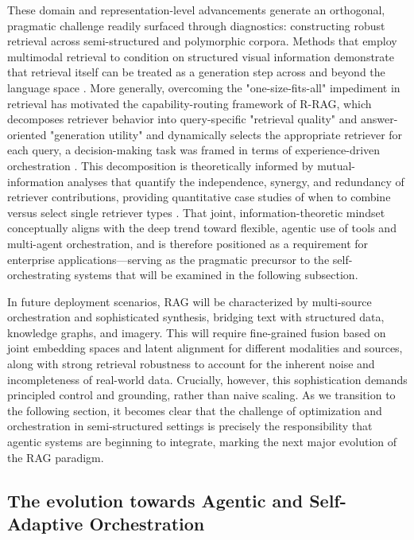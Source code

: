 \documentclass[11pt,a4paper]{article}
\begin{document}
These domain and representation-level advancements generate an orthogonal, pragmatic challenge readily surfaced through diagnostics: constructing robust retrieval across semi-structured and polymorphic corpora. Methods that employ multimodal retrieval to condition on structured visual information demonstrate that retrieval itself can be treated as a generation step across and beyond the language space \cite{arxiv:2407.01219v1}. More generally, overcoming the "one-size-fits-all" impediment in retrieval has motivated the capability-routing framework of R-RAG, which decomposes retriever behavior into query-specific "retrieval quality" and answer-oriented "generation utility" and dynamically selects the appropriate retriever for each query, a decision-making task was framed in terms of experience-driven orchestration \cite{arxiv:2604.22849v1}. This decomposition is theoretically informed by mutual-information analyses that quantify the independence, synergy, and redundancy of retriever contributions, providing quantitative case studies of when to combine versus select single retriever types \cite{arxiv:2604.22849v1}. That joint, information-theoretic mindset conceptually aligns with the deep trend toward flexible, agentic use of tools and multi-agent orchestration, and is therefore positioned as a requirement for enterprise applications---serving as the pragmatic precursor to the self-orchestrating systems that will be examined in the following subsection.

In future deployment scenarios, RAG will be characterized by multi-source orchestration and sophisticated synthesis, bridging text with structured data, knowledge graphs, and imagery. This will require fine-grained fusion based on joint embedding spaces and latent alignment for different modalities and sources, along with strong retrieval robustness to account for the inherent noise and incompleteness of real-world data. Crucially, however, this sophistication demands principled control and grounding, rather than naive scaling. As we transition to the following section, it becomes clear that the challenge of optimization and orchestration in semi-structured settings is precisely the responsibility that agentic systems are beginning to integrate, marking the next major evolution of the RAG paradigm.


\subsection{The evolution towards Agentic and Self-Adaptive Orchestration}
\end{document}
